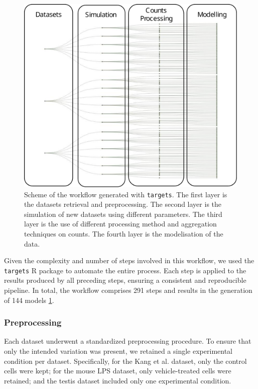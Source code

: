 \documentclass[a4paper, 11pt, twocolumn]{article}
\begin{document}
\begin{multicols}{2}
\begin{figure}[H]
	\centering
	\includegraphics[width=1\columnwidth]{img/workflowCut.pdf}
	\caption{{\footnotesize Scheme of the workflow generated with \texttt{targets}. The first layer is the datasets retrieval and preprocessing. The second layer is the simulation of new datasets using different parameters. The third layer is the use of different processing method and aggregation techniques on counts. The fourth layer is the modelisation of the data.}}
	\label{fig:workflow}
\end{figure}

Given the complexity and number of steps involved in this workflow, we used the \texttt{targets} R package \citep{targets} to automate the entire process. Each step is applied to the results produced by all preceding steps, ensuring a consistent and reproducible pipeline. In total, the workflow comprises 291 steps and results in the generation of 144 models \ref{fig:workflow}.

\subsubsection{Preprocessing}

Each dataset underwent a standardized preprocessing procedure. To ensure that only the intended variation was present, we retained a single experimental condition per dataset. Specifically, for the Kang et al. dataset, only the control cells were kept; for the mouse LPS dataset, only vehicle-treated cells were retained; and the testis dataset included only one experimental condition.


\end{multicols}
\end{document}
